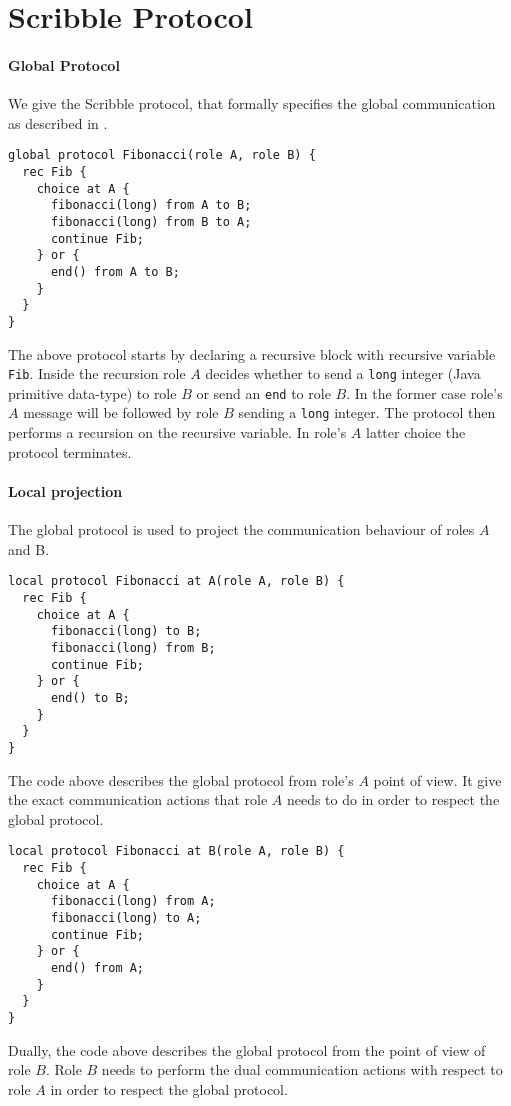 \section{Scribble Protocol}

\paragraph{Global Protocol}
We give the Scribble protocol, that formally specifies the
global communication as described in .
%
\begin{lstlisting}[caption={Global Protocol}]
global protocol Fibonacci(role A, role B) {
  rec Fib {
    choice at A {
      fibonacci(long) from A to B;
      fibonacci(long) from B to A;
      continue Fib;
    } or {
      end() from A to B;
    }
  }
}
\end{lstlisting}

The above protocol starts by declaring a recursive block
with recursive variable \lstinline|Fib|.
Inside the recursion role $A$ decides whether to send
a \lstinline|long| integer (Java primitive data-type)
to role $B$ or send an \lstinline|end| to role $B$.
In the former case role's $A$ message will be followed
by role $B$ sending a \lstinline|long| integer. The protocol
then performs a recursion on the recursive variable.
In role's $A$ latter choice the protocol terminates.

\paragraph{Local projection}
The global protocol is used to project the communication
behaviour of roles $A$ and B.

\begin{lstlisting}[caption={Local Protocol for Role A}]
local protocol Fibonacci at A(role A, role B) {
  rec Fib {
    choice at A {
      fibonacci(long) to B;
      fibonacci(long) from B;
      continue Fib;
    } or {
      end() to B;
    }
  }
}
\end{lstlisting}

The code above describes the global protocol from role's $A$
point of view. It give the exact communication actions that
role $A$ needs to do in order to respect the global protocol.

\begin{lstlisting}[caption={Local Protocol for Role B}]
local protocol Fibonacci at B(role A, role B) {
  rec Fib {
    choice at A {
      fibonacci(long) from A;
      fibonacci(long) to A;
      continue Fib;
    } or {
      end() from A;
    }
  }
}
\end{lstlisting}

Dually, the code above describes the global protocol from
the point of view of role $B$. Role $B$ needs to perform
the dual communication actions with respect to role $A$
in order to respect the global protocol.



